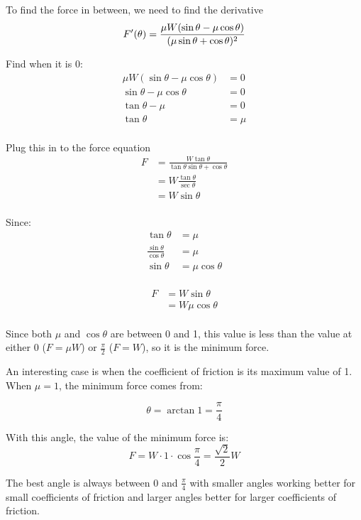 \documentclass[letterpaper]{exam}
\begin{document}
\begin{description}
      To find the force in between, we need to find the derivative
      \[
        F'(\theta) = \frac{\mu  W (\sin \theta - \mu \cos \theta)}
                          {(\mu \sin \theta + \cos \theta)^2} \\
      \]

      Find when it is 0:
      \begin{align*}
        \mu  W (\sin \theta - \mu \cos \theta) & = 0 \\
        \sin \theta - \mu \cos \theta          & = 0 \\
        \tan \theta - \mu                      & = 0 \\
        \tan \theta                            & = \mu \\
      \end{align*}

      Plug this in to the force equation
      \begin{align*}
        F & = \frac{W \tan \theta}{\tan \theta \sin \theta + \cos \theta} \\
          & = W \frac{\tan \theta}{\sec \theta} \\
          & = W \sin \theta \\
      \end{align*}

      Since:
      \begin{align*}
        \tan \theta                     & = \mu \\
        \frac{\sin \theta}{\cos \theta} & = \mu \\
        \sin \theta                     & = \mu \cos \theta \\
      \end{align*}
      
      \begin{align*}
        F & = W \sin \theta \\
          & = W \mu \cos \theta \\
      \end{align*}

      Since both $\mu$ and $\cos \theta$ are between 0 and 1, this value is less than the value at
      either $0$ ($F = \mu W$) or $\frac{\pi}{2}$ ($F = W$), so it is the minimum force.

      An interesting case is when the coefficient of friction is its maximum value of 1. When 
      $\mu = 1$, the minimum force comes from:

      \[
        \theta = \arctan 1 = \frac{\pi}{4}
      \]
      
      With this angle, the value of the minimum force is:
      \[
        F = W \cdot 1 \cdot \cos \frac{\pi}{4} = \frac{\sqrt{2}}{2} W
      \]

      The best angle is always between $0$ and $\frac{\pi}{4}$ with smaller angles working better
      for small coefficients of friction and larger angles better for larger coefficients of
      friction.

  \end{description}
\end{document}
